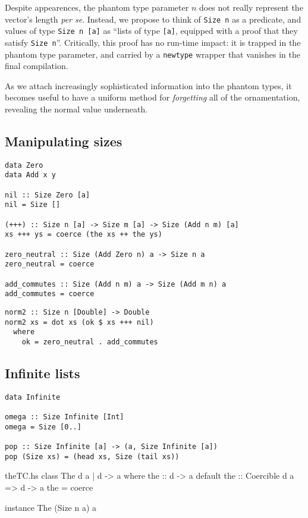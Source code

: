 \documentclass[format=sigplan, review=false, screen=true]{acmart}
\begin{document}
Despite  appearences, the phantom type parameter $n$ does not really represent the vector's length
{\em per se}. Instead, we propose to think of \texttt{Size n} as a predicate, and values of
type \texttt{Size n [a]} as ``lists of type \texttt{[a]}, equipped with a proof
that they satisfy \texttt{Size n}''. Critically, this proof has no run-time impact: it is trapped in the phantom type parameter, and carried by a \texttt{newtype} wrapper that vanishes in
the final compilation.


As we attach increasingly sophisticated information into the phantom types, it becomes useful to
have a uniform method for \emph{forgetting} all of the ornamentation, revealing the normal
value underneath.

\subsection{Manipulating sizes}

\begin{verbatim}
data Zero
data Add x y

nil :: Size Zero [a]
nil = Size []

(+++) :: Size n [a] -> Size m [a] -> Size (Add n m) [a]
xs +++ ys = coerce (the xs ++ the ys)

zero_neutral :: Size (Add Zero n) a -> Size n a
zero_neutral = coerce

add_commutes :: Size (Add n m) a -> Size (Add m n) a
add_commutes = coerce
\end{verbatim}


\begin{verbatim}
norm2 :: Size n [Double] -> Double
norm2 xs = dot xs (ok $ xs +++ nil)
  where
    ok = zero_neutral . add_commutes
\end{verbatim}

\subsection{Infinite lists}

\begin{verbatim}
data Infinite

omega :: Size Infinite [Int]
omega = Size [0..]

pop :: Size Infinite [a] -> (a, Size Infinite [a])
pop (Size xs) = (head xs, Size (tail xs))
\end{verbatim}

\begin{filecontents*}{theTC.hs}
class The d a | d -> a where
    the :: d -> a
    default the :: Coercible d a => d -> a
    the = coerce
    
instance The (Size n a) a
\end{filecontents*}
\end{document}
